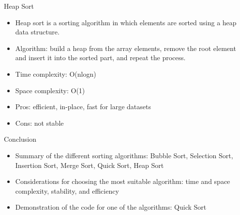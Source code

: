 \documentclass{beamer}
\begin{document}
\begin{frame}{Heap Sort}
\begin{itemize}
    \item Heap sort is a sorting algorithm in which elements are sorted using a heap data structure. 
    \item Algorithm: build a heap from the array elements, remove the root element and insert it into the sorted part, and repeat the process. 
    \item Time complexity: O(nlogn) 
    \item Space complexity: O(1) 
    \item Pros: efficient, in-place, fast for large datasets 
    \item Cons: not stable 
\end{itemize}
\end{frame}

\begin{frame}{Conclusion}
\begin{itemize}
    \item Summary of the different sorting algorithms: Bubble Sort, Selection Sort, Insertion Sort, Merge Sort, Quick Sort, Heap Sort 
    \item Considerations for choosing the most suitable algorithm: time and space complexity, stability, and efficiency 
    \item Demonstration of the code for one of the algorithms: Quick Sort 
\end{itemize}
\end{frame}
\end{document}
